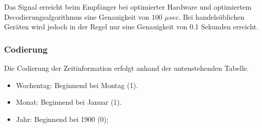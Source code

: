 Das Signal erreicht beim Empfänger bei optimierter Hardware und optimiertem Decodierungsalgorithmus eine Genauigkeit von 100 ${\mu}sec$. Bei handelsüblichen Geräten wird jedoch in der Regel nur eine Genauigkeit von 0.1 Sekunden erreicht.

\begin{figure}
\end{figure}

\subsubsection{Codierung}
Die Codierung der Zeitinformation erfolgt anhand der untenstehenden Tabelle.

\begin{itemize}
\item Wochentag: Beginnend bei Montag (1).
\item Monat: Beginnend bei Januar (1).
\item Jahr: Beginnend bei 1900 (0); %
\end{itemize}


